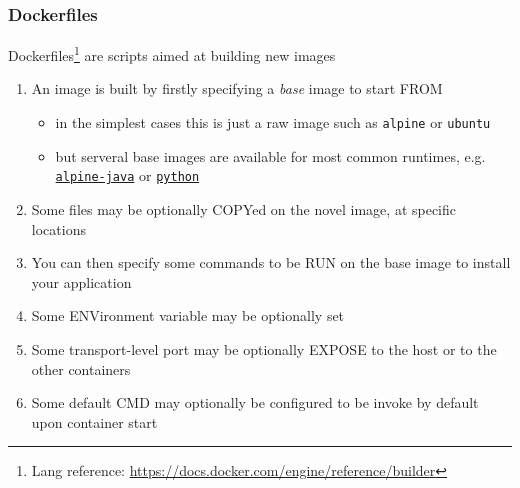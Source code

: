\documentclass{beamer}\mode<presentation>{\usetheme{AMSBolognaFC}}
\begin{document}
\begin{frame}%
\frametitle{Dockerfiles}

    Dockerfiles\footnote{Lang reference: \url{https://docs.docker.com/engine/reference/builder}} are scripts aimed at \alert{building} new images
    \begin{enumerate}
        \item An image is built by firstly specifying a \emph{base} image to start \alert{FROM}
        \begin{itemize}
            \item in the simplest cases this is just a raw image such as \texttt{alpine} or \texttt{ubuntu}
            \item but serveral base images are available for most common runtimes, e.g. \href{https://hub.docker.com/r/anapsix/alpine-java/}{\texttt{alpine-java}} or \href{https://hub.docker.com/_/python/}{\texttt{python}}
        \end{itemize}
        \item Some files may be optionally \alert{COPY}ed on the novel image, at specific locations
        \item You can then specify some commands to be \alert{RUN} on the base image to install your application
        \item Some \alert{ENV}ironment variable may be optionally set
        \item Some transport-level port may be optionally \alert{EXPOSE} to the host or to the other containers
        \item Some default \alert{CMD} may optionally be configured to be invoke by default upon container start

    \end{enumerate}

\end{frame}
\end{document}
